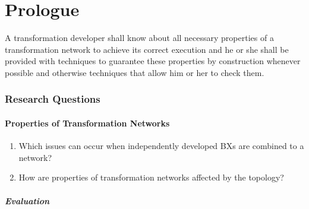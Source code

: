 \part{Prologue
}


\begin{researchgoal}
	A transformation developer shall know about all necessary properties of a transformation network to achieve its correct execution and he or she shall be provided with techniques to guarantee these properties by construction whenever possible and otherwise techniques that allow him or her to check them.
\end{researchgoal}

\section{Research Questions}

\subsection*{Properties of Transformation Networks}
\begin{enumerate}[label=\itshape RQ \arabic*.]
	\item Which issues can occur when independently developed \acp{BX} are combined to a network?
	\item How are properties of transformation networks affected by the topology?
\end{enumerate}

\subsubsection*{Evaluation}

